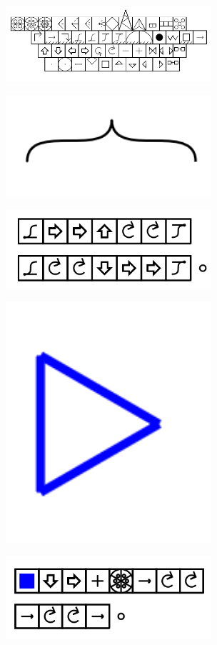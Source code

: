 \documentclass[11pt]{article}
\begin{document}
\includegraphics[width=3in]{image26.png}





\includegraphics[width=3in]{image27.png}

\includegraphics[width=3in]{image28.png}





\includegraphics[width=3in]{image29.png}

\includegraphics[width=3in]{image30.png}
\end{document}
